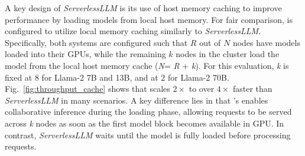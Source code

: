 {
A key design of \textit{ServerlessLLM} is its use of host memory caching to improve performance by loading models from local host memory.  
For fair comparison, \SysName is configured to utilize local memory caching similarly to \textit{ServerlessLLM}.
Specifically, both systems are configured such that $R$ out of $N$ nodes have models loaded into their GPUs,
while the remaining $k$ nodes in the cluster load the model from the local host memory cache (\emph{N}= \emph{R} + \emph{k}).  For this evaluation, \emph{k} is fixed at $8$ for Llama-2 7B and 13B, and at $2$ for Llama-2 70B. Fig.~\ref{fig:throughput_cache} shows that \SysName scales $2\times$ to over $4\times$ faster than \textit{ServerlessLLM} in many scenarios. 
A key difference lies in that \SysName's \AlgoName enables collaborative inference during the loading phase, allowing requests to be served across \emph{k} nodes as soon as the first model block becomes available in GPU.   
In contrast, \textit{ServerlessLLM} waits until the model is fully loaded before processing requests.


}
